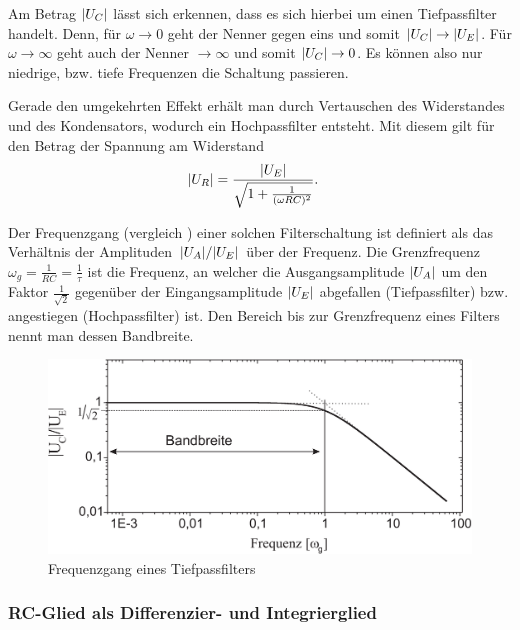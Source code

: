 Am Betrag $\qty|U_C|$ lässt sich erkennen, dass es sich hierbei um einen Tiefpassfilter handelt. Denn, für $\omega \to 0$ geht der Nenner gegen eins und somit $\qty|U_C| \to \qty|U_E|$. Für $\omega \to \infty$ geht auch der Nenner $\to \infty$ und somit $\qty|U_C| \to 0$. Es können also nur niedrige, bzw. tiefe Frequenzen die Schaltung passieren.

Gerade den umgekehrten Effekt erhält man durch Vertauschen des Widerstandes und des Kondensators, wodurch ein Hochpassfilter entsteht. Mit diesem gilt für den Betrag der Spannung am Widerstand
\begin{align}
  \qty|U_R| &= \frac{\qty|U_E|}{\sqrt{1 + \frac{1}{(\omega R C)^2}}}.\label{eq:ampl_hp}
\end{align}

Der Frequenzgang (vergleich ) einer solchen Filterschaltung ist definiert als das Verhältnis der Amplituden $\ffrac{\qty|U_A|}{\qty|U_E|}$ über der Frequenz. Die Grenzfrequenz $\omega_g = \frac{1}{RC} = \frac{1}{\tau}$ ist die Frequenz, an welcher die Ausgangsamplitude $\qty|U_A|$ um den Faktor $\frac{1}{\sqrt{2}}$ gegenüber der Eingangsamplitude $\qty|U_E|$ abgefallen (Tiefpassfilter) bzw. angestiegen (Hochpassfilter) ist. Den Bereich bis zur Grenzfrequenz eines Filters nennt man dessen Bandbreite.

\begin{figure}[H]
  \centering
  \includegraphics[width=.80\textwidth]{files/script/frequenzgang_tiefpass.png}
  \caption{Frequenzgang eines Tiefpassfilters}
  \label{fig:frequenzgang_tiefpass}
\end{figure}

\subsubsection*{RC-Glied als Differenzier- und Integrierglied}

